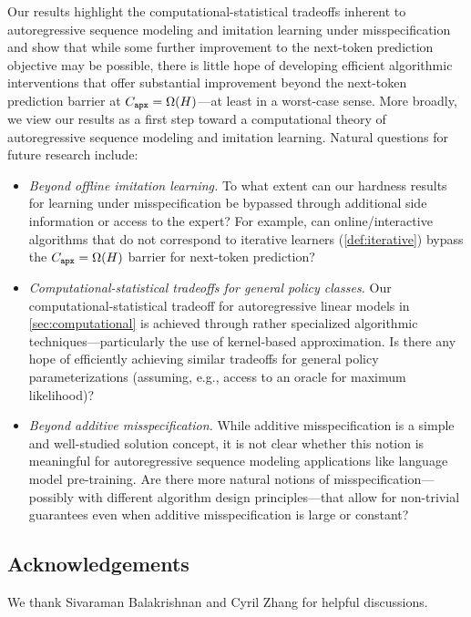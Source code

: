 Our results highlight the computational-statistical tradeoffs inherent to autoregressive
sequence modeling and imitation learning under misspecification and
show that while some further improvement to the next-token prediction
objective may be possible, there is little hope of developing
efficient algorithmic interventions that offer substantial
improvement beyond the next-token prediction barrier at $C_{\texttt{apx}}=\Omega(H)$---at least in a worst-case sense. More broadly, we view
our results as a first step toward a
computational theory of autoregressive sequence modeling and imitation
learning. Natural questions for future research include:
\begin{itemize}
\item \emph{Beyond offline imitation learning.} To what extent can our hardness
  results for learning under misspecification be bypassed through additional side
  information or access
  to the expert? 
  For example, can online/interactive algorithms that do not correspond to iterative learners (\cref{def:iterative}) 
  bypass the
  $C_{\texttt{apx}}=\Omega(H)$ barrier for next-token prediction?
\item \emph{Computational-statistical tradeoffs for general policy
    classes.} Our computational-statistical tradeoff for
  autoregressive linear models in \cref{sec:computational} is achieved
  through rather specialized algorithmic techniques---particularly
  the use of kernel-based approximation. Is there any hope of
  efficiently achieving similar tradeoffs for general policy
  parameterizations (assuming, e.g., access to an oracle for maximum likelihood)?\loose
\item \emph{Beyond additive misspecification.} While additive
  misspecification is a simple and well-studied solution concept, it
  is not clear whether this notion is meaningful for 
  autoregressive sequence modeling applications like language model
  pre-training. Are there more natural notions of
  misspecification---possibly with different algorithm design
  principles---that allow for non-trivial guarantees even when
  additive misspecification is large or constant? 
  \end{itemize}

  \subsection*{Acknowledgements}
  We thank Sivaraman Balakrishnan and Cyril Zhang for helpful discussions.

%





